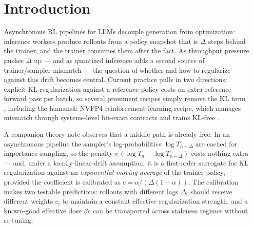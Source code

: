 \documentclass[11pt]{amsart}
\begin{document}
\begin{abstract}
per-rollout weighting can act --- moves the $\beta{=}0$ collapse
${\sim}40$--$55$ steps earlier in both precisions and lifts the
calibrated-vs-uniform comparison out of the tie band ($\pm0.004$) in both,
but with opposite signs ($+0.029$ eval for per-rollout in BF16, $-0.010$
under NVFP4); the structural prediction --- allocation is inert only while
groups are age-homogeneous --- survives, the ranking does not yet resolve.
(6)~An error-triggered switch from the surrogate to the exact EMA-KL term,
designed to catch the FP4 $\Delta{=}32$ late failure, fires where intended
(step 262, before any eval turn, from a trajectory indistinguishable from
its twin) but brings the failure ${\sim}60$--$80$ steps forward: a free
accuracy monitor is a usable alarm, and swapping estimators mid-run is not a
free correction.
\end{abstract}

\section{Introduction}

Asynchronous RL pipelines for LLMs decouple generation from optimization:
inference workers produce rollouts from a policy snapshot that is $\Delta$
steps behind the trainer, and the trainer consumes them after the fact. As
throughput pressure pushes $\Delta$ up --- and as quantized inference adds a
second source of trainer/sampler mismatch --- the question of whether and how
to regularize against this drift becomes central. Current practice pulls in
two directions: explicit KL regularization against a reference policy costs
an extra reference forward pass per batch, so several prominent recipes
simply remove the KL term \cite{dapo}, including the humans\& NVFP4
reinforcement-learning recipe, which manages mismatch through systems-level
bit-exact contracts and trains KL-free \cite{humansand}.

A companion theory note \cite{theorynote} observes that a middle path is
already free. In an asynchronous pipeline the sampler's log-probabilities
$\log T_{n-\Delta}$ are cached for importance sampling, so the penalty
$c\,(\log T_n - \log T_{n-\Delta})$ costs nothing extra --- and, under a
locally-linear-drift assumption, it is a first-order surrogate for KL
regularization against an \emph{exponential moving average} of the trainer
policy, provided the coefficient is calibrated as
$c = \alpha/(\Delta(1-\alpha))$. The calibration makes two testable
predictions: rollouts with different lags $\Delta_i$ should receive
different weights $c_i$ to maintain a constant effective regularization
strength, and a known-good effective dose $\beta c$ can be transported
across staleness regimes without re-tuning.
\end{document}
